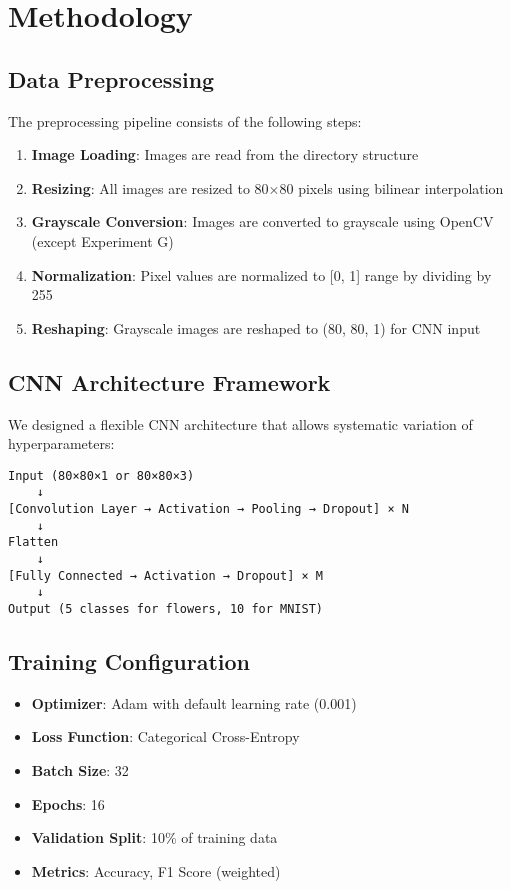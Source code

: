 \documentclass[12pt,a4paper]{article}
\begin{document}
\section{Methodology}

\subsection{Data Preprocessing}
The preprocessing pipeline consists of the following steps:
\begin{enumerate}
    \item \textbf{Image Loading}: Images are read from the directory structure
    \item \textbf{Resizing}: All images are resized to 80×80 pixels using bilinear interpolation
    \item \textbf{Grayscale Conversion}: Images are converted to grayscale using OpenCV (except Experiment G)
    \item \textbf{Normalization}: Pixel values are normalized to [0, 1] range by dividing by 255
    \item \textbf{Reshaping}: Grayscale images are reshaped to (80, 80, 1) for CNN input
\end{enumerate}

\subsection{CNN Architecture Framework}
We designed a flexible CNN architecture that allows systematic variation of hyperparameters:

\begin{verbatim}
Input (80×80×1 or 80×80×3)
    ↓
[Convolution Layer → Activation → Pooling → Dropout] × N
    ↓
Flatten
    ↓
[Fully Connected → Activation → Dropout] × M
    ↓
Output (5 classes for flowers, 10 for MNIST)
\end{verbatim}

\subsection{Training Configuration}
\begin{itemize}
    \item \textbf{Optimizer}: Adam with default learning rate (0.001)
    \item \textbf{Loss Function}: Categorical Cross-Entropy
    \item \textbf{Batch Size}: 32
    \item \textbf{Epochs}: 16
    \item \textbf{Validation Split}: 10\% of training data
    \item \textbf{Metrics}: Accuracy, F1 Score (weighted)
\end{itemize}
\end{document}
